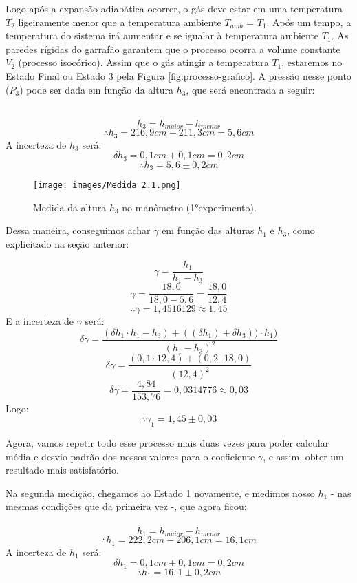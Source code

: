 Logo após a expansão adiabática ocorrer, o gás deve estar em uma temperatura $T_2$ ligeiramente menor que a temperatura ambiente $T_{amb}$ = $T_1$. Após um tempo, a temperatura do sistema irá aumentar e se igualar à temperatura ambiente $T_1$. As paredes rígidas do garrafão garantem que o processo ocorra a volume constante $V_2$ (processo isocórico). Assim que o gás atingir a temperatura $T_1$, estaremos no Estado Final ou Estado 3 pela Figura \ref{fig:processo-grafico}. A pressão nesse ponto ($P_3$) pode ser dada em função da altura $h_3$, que será encontrada a seguir:\

\ \[h_3 = h_{maior} - h_{menor} \]
\[\therefore h_3 = 216,9 cm - 211,3 cm  =  5,6 cm\]
A incerteza de $h_3$ será:\\
\[\delta h_3 = 0,1 cm + 0,1 cm =  0,2 cm\]
\[\therefore h_3 = 5,6 \pm 0,2 cm\]


\begin{figure}[H]
  \centering
  \texttt{[image: images/Medida 2.1.png]}
  \caption{Medida da altura $h_3$ no manômetro (1°experimento).}
\end{figure}

Dessa maneira, conseguimos achar $\gamma$ em função das alturas $h_1$ e $h_3$, como explicitado na seção anterior:\ 

\[ \gamma = \frac{h_1}{h_1 - h_3}\]
\[ \gamma = \frac{18,0}{18,0 - 5,6} = \frac{18,0}{12,4} \]
\[\therefore \gamma = 1,4516129 \approx 1,45\]
E a incerteza de $\gamma$ será:\\
\[\delta \gamma = \frac{(\delta h_1 \cdot h_1 - h_3)+((\delta h_1) + \delta h_3)) \cdot h_1)}{(h_1 - h_3)^2}\]
\[\delta \gamma = \frac{(0,1 \cdot 12,4)+(0,2 \cdot 18,0)}{(12,4)^2}\]
\[\delta \gamma = \frac{4,84}{153,76} = 0,0314776 \approx 0,03\]
Logo:\\ 
\[\therefore \gamma_1 = 1,45 \pm 0,03 \]

Agora, vamos repetir todo esse processo mais duas vezes para poder calcular média e desvio padrão dos nossos valores para o coeficiente $\gamma$, e assim, obter um resultado mais satisfatório.

Na segunda medição, chegamos ao Estado 1 novamente, e medimos nosso $h_1$ - nas mesmas condições que da primeira vez -, que agora ficou:\\

\ \[h_1 = h_{maior} - h_{menor} \]
\[\therefore h_1 = 222,2 cm - 206,1 cm  =  16,1 cm\]
A incerteza de $h_1$ será:\\
\[\delta h_1 = 0,1 cm + 0,1 cm =  0,2 cm\]
\[\therefore h_1 = 16,1 \pm 0,2 cm\]

